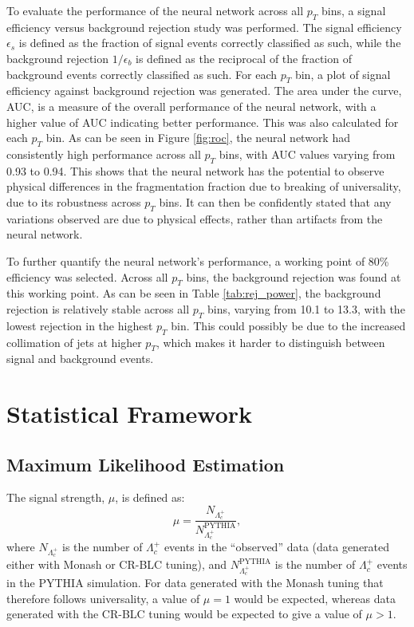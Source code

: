 \documentclass[12pt]{article}
\begin{document}
To evaluate the performance of the neural network across all $p_T$ bins, a signal efficiency versus background rejection study was performed. The signal efficiency $\epsilon_s$ is defined as the fraction of signal events correctly classified as such, while the background rejection $1/\epsilon_b$ is defined as the reciprocal of the fraction of background events correctly classified as such. For each $p_T$ bin, a plot of signal efficiency against background rejection was generated. The area under the curve, AUC, is a measure of the overall performance of the neural network, with a higher value of AUC indicating better performance. This was also calculated for each $p_T$ bin. As can be seen in Figure \ref{fig:roc}, the neural network had consistently high performance across all $p_T$ bins, with AUC values varying from 0.93 to 0.94. This shows that the neural network has the potential to observe physical differences in the fragmentation fraction due to breaking of universality, due to its robustness across $p_T$ bins. It can then be confidently stated that any variations observed are due to physical effects, rather than artifacts from the neural network.

To further quantify the neural network's performance, a working point of 80\% efficiency was selected. Across all $p_T$ bins, the background rejection was found at this working point. As can be seen in Table \ref{tab:rej_power}, the background rejection is relatively stable across all $p_T$ bins, varying from 10.1 to 13.3, with the lowest rejection in the highest $p_T$ bin. This could possibly be due to the increased collimation of jets at higher $p_T$, which makes it harder to distinguish between signal and background events.






\newpage
\section{Statistical Framework}
\label{sec:stat_framework}

\subsection{Maximum Likelihood Estimation}
The signal strength, $\mu$, is defined as:
\begin{equation}
    \mu = \frac{N_{\Lambda_c^+}}{N_{\Lambda_c^+}^{\text{PYTHIA}}},
\end{equation}
where $N_{\Lambda_c^+}$ is the number of $\Lambda_c^+$ events in the ``observed'' data (data generated either with Monash or CR-BLC tuning), and $N_{\Lambda_c^+}^{\text{PYTHIA}}$ is the number of $\Lambda_c^+$ events in the PYTHIA simulation. For data generated with the Monash tuning that therefore follows universality, a value of $\mu = 1$ would be expected, whereas data generated with the CR-BLC tuning would be expected to give a value of $\mu > 1$.
\end{document}
